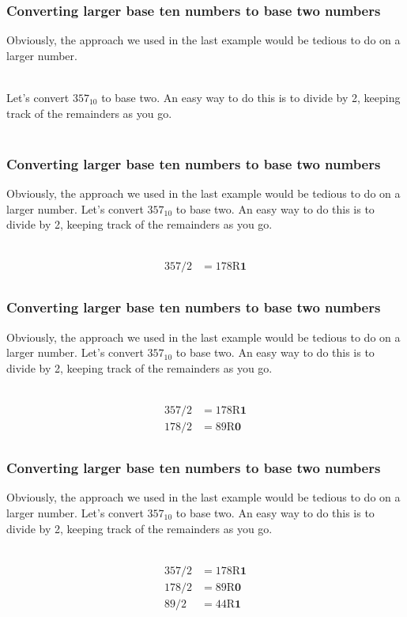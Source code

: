 \documentclass{if-beamer}
\begin{document}
\begin{frame}
\frametitle{Converting larger base ten numbers to base two numbers}

Obviously, the approach we used in the last example would be tedious to do on a larger number. \\~\

Let's convert $357_{10}$ to base two. An easy way to do this is to divide by 2, keeping track of the remainders as you go. \\~\
\end{frame}

\begin{frame}
\frametitle{Converting larger base ten numbers to base two numbers}

Obviously, the approach we used in the last example would be tedious to do on a larger number. Let's convert $357_{10}$ to base two. An easy way to do this is to divide by 2, keeping track of the remainders as you go. \\~\

\centering
\begin{align*}
357/2 &= 178 \textrm{R}\textbf{1} \\
\end{align*}
\end{frame}

\begin{frame}
\frametitle{Converting larger base ten numbers to base two numbers}

Obviously, the approach we used in the last example would be tedious to do on a larger number. Let's convert $357_{10}$ to base two. An easy way to do this is to divide by 2, keeping track of the remainders as you go. \\~\

\centering
\begin{align*}
357/2 &= 178 \textrm{R}\textbf{1} \\
178/2 &= 89 \textrm{R}\textbf{0}\\
\end{align*}
\end{frame}

\begin{frame}
\frametitle{Converting larger base ten numbers to base two numbers}

Obviously, the approach we used in the last example would be tedious to do on a larger number. Let's convert $357_{10}$ to base two. An easy way to do this is to divide by 2, keeping track of the remainders as you go. \\~\

\centering
\begin{align*}
357/2 &= 178 \textrm{R}\textbf{1} \\
178/2 &= 89 \textrm{R}\textbf{0}\\
89/2 &= 44 \textrm{R}\textbf{1}\\
\end{align*}
\end{frame}
\end{document}
